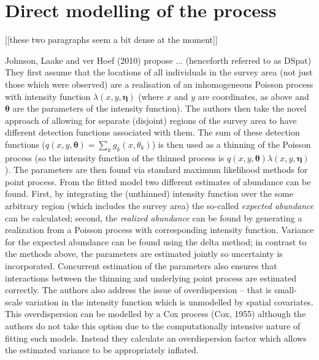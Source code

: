 \documentclass[useAMS,referee]{biom}
\begin{document}
\section{Direct modelling of the process}
\label{s:direct}

[[these two paragraphs seem a bit dense at the moment]]

Johnson, Laake and ver Hoef (2010) propose ... (henceforth referred to as DSpat) They first assume that the locations of all individuals in the survey area (not just those which were observed) are a realisation of an inhomogeneous Poisson process with intensity function $\lambda(x,y,\bm{\eta})$ (where $x$ and $y$ are coordinates, as above and $\bm{\theta}$ are the parameters of the intensity function). The authors then take the novel approach of allowing for separate (disjoint) regions of the survey area to have different detection functions associated with them. The sum of these detection functions ($q(x,y,\bm{\theta}) = \sum_k g_k(x,\theta_k)$) is then used as a thinning of the Poisson process (so the intensity function of the thinned process is $q(x,y,\bm{\theta})\lambda(x,y,\bm{\eta})$). The parameters are then found via standard maximum likelihood methods for point process. From the fitted model two different estimates of abundance can be found. First, by integrating the (unthinned) intensity function over the some arbitrary region (which includes the survey area) the so-called \textit{expected abundance} can be calculated; second, the \textit{realized abundance} can be found by generating a realization from a Poisson process with corresponding intensity function. Variance for the expected abundance can be found using the delta method; in contrast to the methods above, the parameters are estimated jointly so uncertainty is incorporated. Concurrent estimation of the parameters also ensures that interactions between the thinning and underlying point process are estimated correctly. The authors also address the issue of overdispersion -- that is small-scale variation in the intensity function which is unmodelled by spatial covariates. This overdispersion can be modelled by a Cox process (Cox, 1955) although the authors do not take this option due to the computationally intensive nature of fitting such models. Instead they calculate an overdispersion factor which allows the estimated variance to be appropriately inflated.
\end{document}
